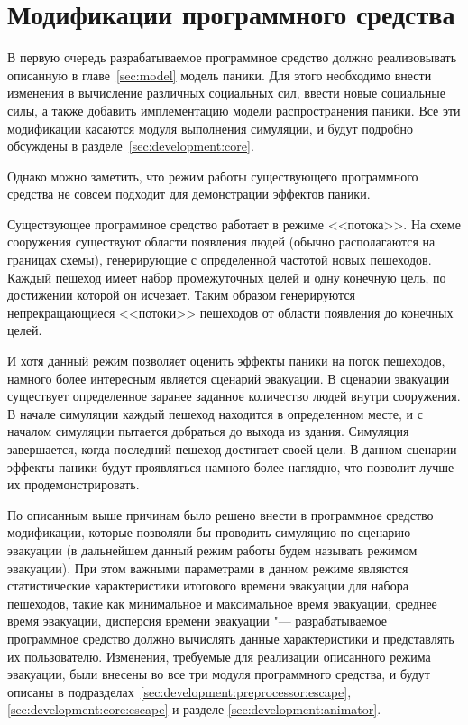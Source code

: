 \section{Модификации программного средства}
\label{sec:development:common}

В первую очередь разрабатываемое программное средство должно реализовывать описанную в главе~\ref{sec:model} модель паники.
Для этого необходимо внести изменения в вычисление различных социальных сил, ввести новые социальные силы,
а также добавить имплементацию модели распространения паники.
Все эти модификации касаются модуля выполнения симуляции, и будут подробно обсуждены в разделе~\ref{sec:development:core}.

Однако можно заметить, что режим работы существующего программного средства не совсем подходит для демонстрации эффектов паники.

Существующее программное средство работает в режиме <<потока>>.
На схеме сооружения существуют области появления людей (обычно располагаются на границах схемы),
генерирующие с определенной частотой новых пешеходов.
Каждый пешеход имеет набор промежуточных целей и одну конечную цель, по достижении которой он исчезает.
Таким образом генерируются непрекращающиеся <<потоки>> пешеходов от области появления до конечных целей.

И хотя данный режим позволяет оценить эффекты паники на поток пешеходов, намного более интересным является сценарий эвакуации.
В сценарии эвакуации существует определенное заранее заданное количество людей внутри сооружения.
В начале симуляции каждый пешеход находится в определенном месте, и с началом симуляции пытается добраться до выхода из здания.
Симуляция завершается, когда последний пешеход достигает своей цели.
В данном сценарии эффекты паники будут проявляться намного более наглядно, что позволит лучше их продемонстрировать.

По описанным выше причинам было решено внести в программное средство модификации,
которые позволяли бы проводить симуляцию по сценарию эвакуации
(в дальнейшем данный режим работы будем называть режимом эвакуации).
При этом важными параметрами в данном режиме являются статистические характеристики
итогового времени эвакуации для набора пешеходов, такие как минимальное и максимальное время эвакуации,
среднее время эвакуации, дисперсия времени эвакуации "---
разрабатываемое программное средство должно вычислять данные характеристики и представлять их пользователю.
Изменения, требуемые для реализации описанного режима эвакуации, были внесены во все три модуля программного средства,
и будут описаны в подразделах~\ref{sec:development:preprocessor:escape}, \ref{sec:development:core:escape} и разделе \ref{sec:development:animator}.



